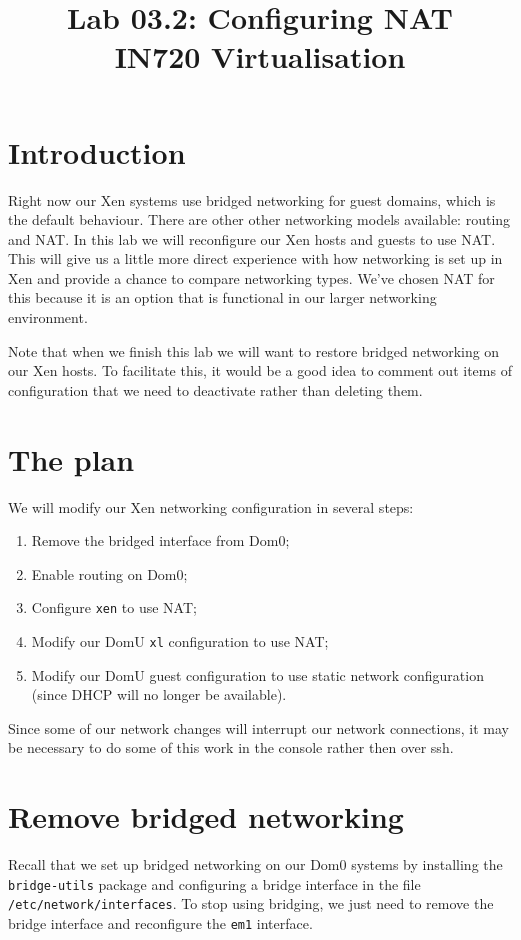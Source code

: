\documentclass{article}
\begin{document}
\title{Lab 03.2: Configuring NAT\\ IN720 Virtualisation}
\date{}
\maketitle

\section*{Introduction}
Right now our Xen systems use bridged networking for guest domains, which is the default behaviour. There are 
other other networking models available: routing and NAT. In this lab we will reconfigure our Xen hosts and guests 
to use NAT. This will give us a little more direct experience with how networking is set up in Xen and provide a chance 
to compare networking types. We've chosen NAT for this because it is an option that is functional in our larger 
networking environment.

Note that when we finish this lab we will want to restore bridged networking on our Xen hosts. To facilitate this, it 
would be a good idea to comment out items of configuration that we need to deactivate rather than deleting them.

\section{The plan}
We will modify our Xen networking configuration in several steps:

\begin{enumerate}
  \item Remove the bridged interface from Dom0;
  \item Enable routing on Dom0;
  \item Configure \texttt{xen} to use NAT;
  \item Modify our DomU \texttt{xl} configuration to use NAT;
  \item Modify our DomU guest configuration to use static network configuration (since DHCP will no longer be available).
\end{enumerate}

Since some of our network changes will interrupt our network connections, it may be necessary to do some of this work in the console rather then over ssh.

\section{Remove bridged networking}
Recall that we set up bridged networking on our Dom0 systems by installing the \texttt{bridge-utils} package and configuring a bridge interface in the file \texttt{/etc/network/interfaces}. To stop using bridging, we just need to remove 
the bridge interface and reconfigure the \texttt{em1} interface.
\end{document}
